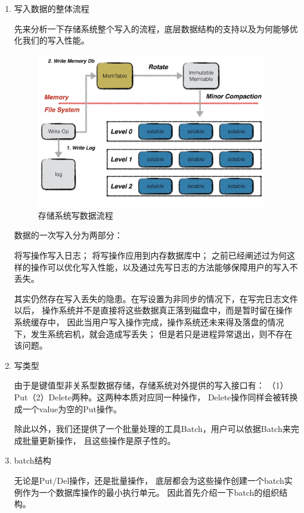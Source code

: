 		\begin{enumerate}
		\item 写入数据的整体流程
			
		先来分析一下存储系统整个写入的流程，底层数据结构的支持以及为何能够优化我们的写入性能。
		
		\begin{figure}[H]
			\centering
			\includegraphics[width=0.95\textwidth]{images/write_op}
			\caption{存储系统写数据流程}
			\label{write_op}
		\end{figure}

		数据的一次写入分为两部分：

		将写操作写入日志；
		将写操作应用到内存数据库中；
		之前已经阐述过为何这样的操作可以优化写入性能，以及通过先写日志的方法能够保障用户的写入不丢失。

		其实仍然存在写入丢失的隐患。在写设置为非同步的情况下，在写完日志文件以后，
		操作系统并不是直接将这些数据真正落到磁盘中，而是暂时留在操作系统缓存中，
		因此当用户写入操作完成，操作系统还未来得及落盘的情况下，发生系统宕机，就会造成写丢失；
		但是若只是进程异常退出，则不存在该问题。

		\item 写类型
		
		由于是键值型非关系型数据存储，存储系统对外提供的写入接口有：
		（1）Put（2）Delete两种。这两种本质对应同一种操作，
		Delete操作同样会被转换成一个value为空的Put操作。
	
		除此以外，我们还提供了一个批量处理的工具Batch，用户可以依据Batch来完成批量更新操作，
		且这些操作是原子性的。

		\item batch结构
		
		无论是Put/Del操作，还是批量操作，
		底层都会为这些操作创建一个batch实例作为一个数据库操作的最小执行单元。
		因此首先介绍一下batch的组织结构。


\end{enumerate}
